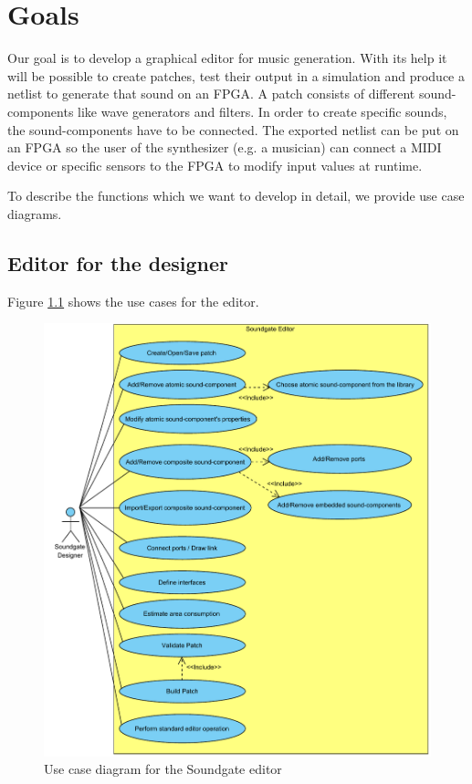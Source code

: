 \chapter{Goals}
\label{chapter:Goals}
Our goal is to develop a graphical editor for music generation. With its help it will be possible to create patches, test their output in a simulation and produce a netlist to generate that sound on an \ac{FPGA}. A patch consists of different sound-components like wave generators and filters. In order to create specific sounds, the sound-components have to be connected. The exported netlist can be put on an \ac{FPGA} so the user of the synthesizer (e.g. a musician) can connect a MIDI device or specific sensors to the \ac{FPGA} to modify input values at runtime.

To describe the functions which we want to develop in detail, we provide use case diagrams.

\section{Editor for the designer}
\label{editor}
Figure \ref{fig:Soundgate_Designer} shows the use cases for the editor.

	\begin{figure}[!h]
		\centering
			\includegraphics[width=1\textwidth]{images/Soundgate_Designer.pdf}
		\caption{Use case diagram for the Soundgate editor}
		\label{fig:Soundgate_Designer}
	\end{figure}

